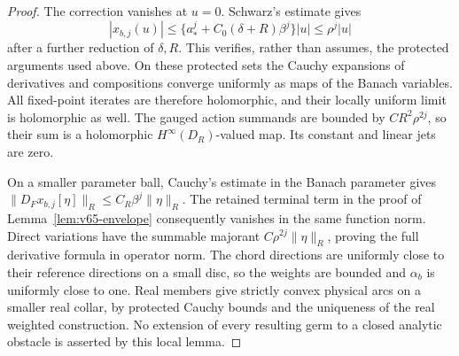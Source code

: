 \begin{proof}
The correction vanishes at $u=0$.  Schwarz's estimate gives
\[
 |x_{b,j}(u)|\le
       \{a_*^j+C_0(\delta+R)\beta^j\}|u|\le\rho^j|u|
\]
after a further reduction of $\delta,R$.  This verifies, rather than
assumes, the protected arguments used above.  On these protected sets
the Cauchy expansions of derivatives and compositions converge uniformly
as maps of the Banach variables.  All fixed-point iterates are therefore
holomorphic, and their locally uniform limit is holomorphic as well.
The gauged action summands are bounded by $CR^2\rho^{2j}$, so their
sum is a holomorphic $H^\infty(D_R)$-valued map.  Its constant and
linear jets are zero.

On a smaller parameter ball, Cauchy's estimate in the Banach parameter
gives $\|D_Fx_{b,j}[\eta]\|_R\le C_R\beta^j\|\eta\|_R$.
The retained terminal term in the proof of
Lemma~\ref{lem:v65-envelope} consequently vanishes in the same function
norm.  Direct variations have the summable majorant
$C\rho^{2j}\|\eta\|_R$, proving the full derivative formula in
operator norm.  The chord directions are uniformly close to their
reference directions on a small disc, so the weights are bounded and
$\alpha_b$ is uniformly close to one.  Real members give strictly
convex physical arcs on a smaller real collar, by protected Cauchy
bounds and the uniqueness of the real weighted construction.
No extension of every resulting germ to a closed analytic obstacle is
asserted by this local lemma.
\end{proof}

